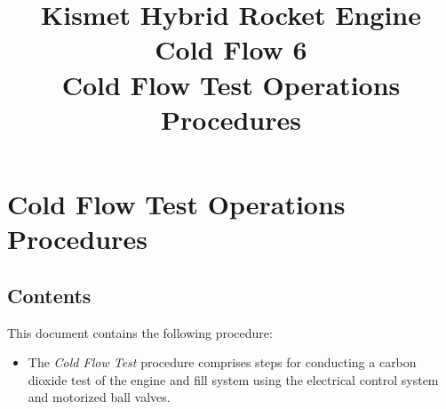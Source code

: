 

\title{
\Huge Kismet Hybrid Rocket Engine\\
Cold Flow 6\\
\vspace{1cm}
\Large Cold Flow Test Operations Procedures}





\section{Cold Flow Test Operations Procedures}

\subsection{Contents}
This document contains the following procedure:
\begin{itemize}
    \item The \textit{Cold Flow Test} procedure comprises steps for conducting a carbon dioxide test of the engine and fill system using the electrical control system and motorized ball valves.
\end{itemize}

